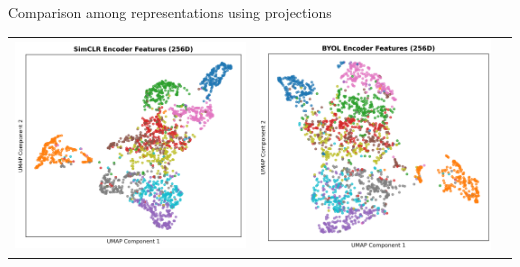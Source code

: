 \documentclass{beamer}
\begin{document}
\begin{frame}{Comparison among representations using projections}
  \begin{center}
    \begin{tabular}{ccc}
      \includegraphics[scale=0.2]{./figs/simclr_umap_projection.png}&
      \includegraphics[scale=0.2]{./figs/byol_umap_projection.png}&

\end{tabular}
\end{center}
\end{frame}
\end{document}
